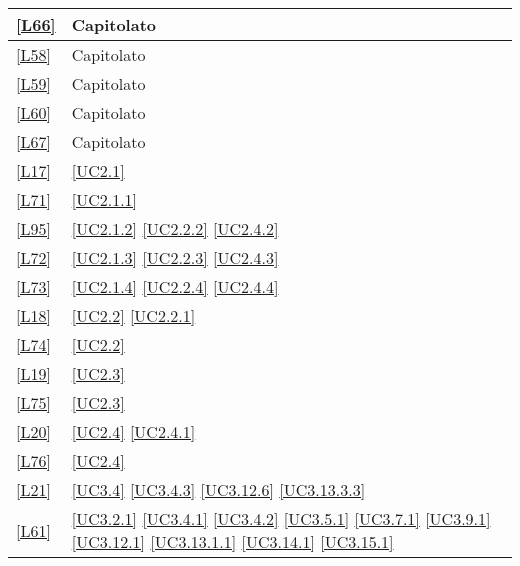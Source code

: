 \begin{longtable}{|P{6cm}|P{6cm}|}
	\hline \ref{L66} & Capitolato \\
	\hline \ref{L58} & Capitolato \\
	\hline \ref{L59} & Capitolato \\
	\hline \ref{L60} & Capitolato \\
	\hline \ref{L67} & Capitolato \\
	\hline \ref{L17} & \ref{UC2.1} \\
	\hline \ref{L71} & \ref{UC2.1.1} \\
	\hline \ref{L95} & \ref{UC2.1.2} \linebreak \ref{UC2.2.2} \linebreak \ref{UC2.4.2} \\
	\hline \ref{L72} & \ref{UC2.1.3} \linebreak \ref{UC2.2.3} \linebreak \ref{UC2.4.3} \\
	\hline \ref{L73} & \ref{UC2.1.4} \linebreak \ref{UC2.2.4} \linebreak \ref{UC2.4.4} \\
	\hline \ref{L18} & \ref{UC2.2} \linebreak \ref{UC2.2.1} \\
	\hline \ref{L74} & \ref{UC2.2} \\
	\hline \ref{L19} & \ref{UC2.3} \\
	\hline \ref{L75} & \ref{UC2.3} \\
	\hline \ref{L20} & \ref{UC2.4} \linebreak \ref{UC2.4.1} \\
	\hline \ref{L76} & \ref{UC2.4} \\	
	\hline \ref{L21} & \ref{UC3.4} \linebreak \ref{UC3.4.3} \linebreak \ref{UC3.12.6} \linebreak \ref{UC3.13.3.3} \\
	\hline \ref{L61} & \ref{UC3.2.1} \linebreak \ref{UC3.4.1} \linebreak \ref{UC3.4.2} \linebreak \ref{UC3.5.1} \linebreak \ref{UC3.7.1} \linebreak \ref{UC3.9.1} \linebreak \ref{UC3.12.1} \linebreak \ref{UC3.13.1.1} \linebreak \ref{UC3.14.1} \linebreak \ref{UC3.15.1} \\

\end{longtable}

